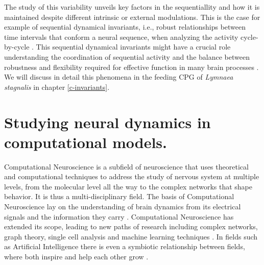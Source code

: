 The study of this variability unveils key factors in the sequentiallity and how it is maintained despite different intrinsic or external modulations. This is the case for example of sequential dynamical invariants, i.e., robust relationships between time intervals that conform a neural sequence, when analyzing the activity cycle-by-cycle \parencite{reyes_artificial_2008,elices_robust_2019,garrido-pena_characterization_2021,berbel_emergence_2024}. This sequential dynamical invariants might have a crucial role understanding the coordination of sequential activity and the balance between robustness and flexibility required for effective function in many brain processes \parencite{tatsuno_analysis_2015,ullen_neural_2003,zimnik_independent_2021,zhou_neural_2020,dragoi_cell_2020}. We will discuss in detail this phenomena in the feeding CPG of \textit{Lymnaea stagnalis} in chapter \ref{c-invariants}.


\section{Studying neural dynamics in computational models.}
\label{sec:computational neuroscience}
Computational Neuroscience is a subfield of neuroscience that uses theoretical and computational techniques to address the study of nervous system at multiple levels, from the molecular level all the way to the complex networks that shape behavior. It is thus a multi-disciplinary field. The basis of Computational Neuroscience lay on the understanding of brain dynamics from its electrical signals and the information they carry \parencite{schwiening_brief_2012,catterall_hodgkin-huxley_2012,dimitrov_information_2011,shannon_mathematical_1948}. Computational Neuroscience has extended its scope, leading to new paths of research including complex networks, graph theory, single cell analysis and machine learning techniques \parencite{cns2023}. In fields such as Artificial Intelligence there is even a symbiotic relationship between fields, where both inspire and help each other grow \parencite{amunts_human_2019,wozniak_deep_2020,goncalves_training_2020}.


